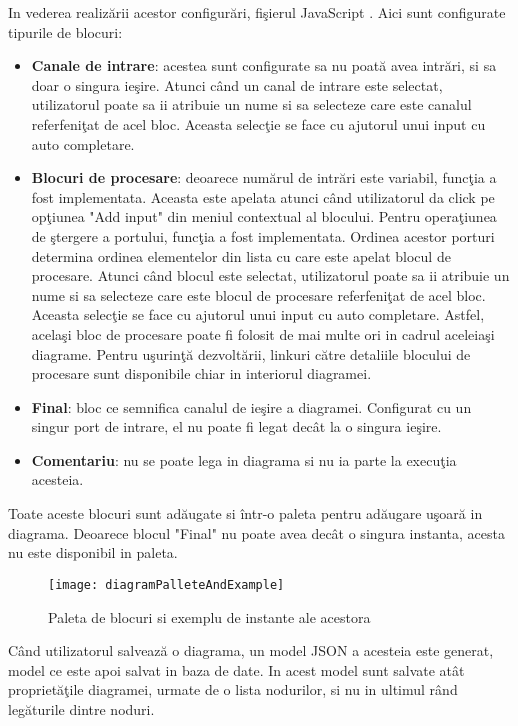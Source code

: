 In vederea realizării acestor configurări, fişierul JavaScript . Aici sunt configurate tipurile de blocuri:
\begin{itemize}
	\item \textbf{Canale de intrare}: acestea sunt configurate sa nu poată avea intrări, si sa doar o singura ieşire. Atunci când un canal de intrare este selectat, utilizatorul poate sa ii atribuie un nume si sa selecteze care este canalul referfeniţat de acel bloc. Aceasta selecţie se face cu ajutorul unui input cu auto completare.
	\item \textbf{Blocuri de procesare}: deoarece numărul de intrări este variabil, funcţia   a fost implementata. Aceasta este apelata atunci când utilizatorul da click pe opţiunea "Add input" din meniul contextual al blocului. Pentru operaţiunea de ştergere a portului, funcţia  a fost implementata. Ordinea acestor porturi determina ordinea elementelor din lista cu care este apelat blocul de procesare. Atunci când blocul este selectat, utilizatorul poate sa ii atribuie un nume si sa selecteze care este blocul de procesare referfeniţat de acel bloc. Aceasta selecţie se face cu ajutorul unui input cu auto completare. Astfel, acelaşi bloc de procesare poate fi folosit de mai multe ori in cadrul aceleiaşi diagrame. Pentru uşurinţă dezvoltării, linkuri către detaliile blocului de procesare sunt disponibile chiar in interiorul diagramei.
	\item \textbf{Final}: bloc ce semnifica canalul de ieşire a diagramei. Configurat cu un singur port de intrare, el nu poate fi legat decât la o singura ieşire.
	\item \textbf{Comentariu}: nu se poate lega in diagrama si nu ia parte la execuţia acesteia. 
\end{itemize}
Toate aceste blocuri sunt adăugate si într-o paleta pentru adăugare uşoară in diagrama. Deoarece blocul "Final" nu poate avea decât o singura instanta, acesta nu este disponibil in paleta.
\begin{figure}[H]
	\centering
	\texttt{[image: diagramPalleteAndExample]}
	\caption{Paleta de blocuri si exemplu de instante ale acestora}
	\label{fig:diagramPalleteAndExample}
\end{figure}
Când utilizatorul salvează o diagrama, un model JSON a acesteia este generat, model ce este apoi salvat in baza de date. In acest model sunt salvate atât proprietăţile diagramei, urmate de o lista nodurilor, si nu in ultimul rând legăturile dintre noduri.

